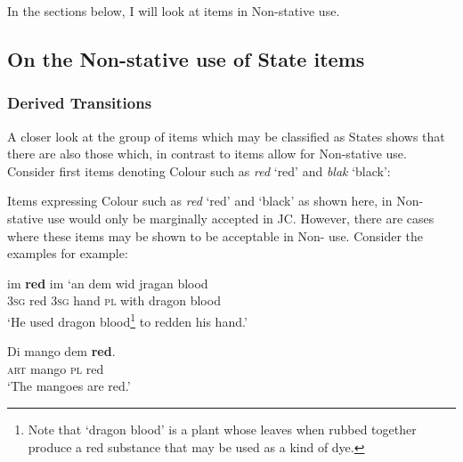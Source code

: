 In the sections below, I will look at  items in Non-stative use. 

\subsection{On the Non-stative use of State items}\label{sec:5.2.3}
\subsubsection{Derived Transitions}\label{sec:5.2.3.1}

A closer look at the group of items which may be classified as States shows that there are also those which, in contrast to items  allow for Non-stative use. Consider first items denoting Colour such as \textit{red} `red' and \textit{blak} `black': 

\ea%
 \label{ex:5:20} 


\z
\z

 Items expressing Colour such as \textit{red} `red' and `black' as shown here, in Non-stative use would only be marginally accepted in JC. However, there are cases where these items may be shown to be acceptable in Non- use. Consider the examples  for example:


\ea%
 \label{ex:5:21}
\gll im \textbf{red} im ‘an dem wid jragan blood\\
\textsc{3sg} red \textsc{3sg} hand {\textsc{pl}} with dragon blood\\
\glt ‘He used dragon blood\footnote{Note that `dragon blood' is a plant whose leaves when rubbed together produce a red substance that may be used as a kind of dye.} to redden his hand.'
 \z

\ea%
 \label{ex:5:22}
\ea 
\gll Di mango dem \textbf{red}.\\
\textsc{art} mango {\textsc{pl}} red\\
\glt {} `The mangoes are red.'

